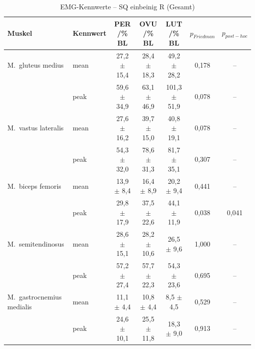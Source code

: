 \begin{table}[H]
  \centering
  \caption{EMG-Kennwerte – SQ einbeinig R (Gesamt)}
  \label{tab:SQ_einbeinig_R_Gesamt}
  \small
  \begin{tabular}{l l c c c c c }
    \hline
\textbf{Muskel} & \textbf{Kennwert} & \textbf{PER /\% BL} & \textbf{OVU /\% BL} & \textbf{LUT /\% BL} & \textbf{$p_{Friedman}$} & \textbf{$p_{post-hoc}$} \\
    \hline
    M.~gluteus medius & mean & 27{,}2 $\pm$ 15{,}4 & 28{,}4 $\pm$ 18{,}3 & 49{,}2 $\pm$ 28{,}2 & 0{,}178 & --\\
     & peak & 59{,}6 $\pm$ 34{,}9 & 63{,}1 $\pm$ 46{,}9 & 101{,}3 $\pm$ 51{,}9 & 0{,}078 & --\\
    \hline
    M.~vastus lateralis & mean & 27{,}6 $\pm$ 16{,}2 & 39{,}7 $\pm$ 15{,}0 & 40{,}8 $\pm$ 19{,}1 & 0{,}078 & --\\
     & peak & 54{,}3 $\pm$ 32{,}0 & 78{,}6 $\pm$ 31{,}3 & 81{,}7 $\pm$ 35{,}1 & 0{,}307 & --\\
    \hline
    M.~biceps femoris & mean & 13{,}9 $\pm$ 8{,}4 & 16{,}4 $\pm$ 8{,}9 & 20{,}2 $\pm$ 9{,}4 & 0{,}441 & --\\
     & peak & 29{,}8 $\pm$ 17{,}9 & 37{,}5 $\pm$ 22{,}6 & 44{,}1 $\pm$ 11{,}9 & 0{,}038 & 0{,}041\\
    \hline
    M.~semitendinosus & mean & 28{,}6 $\pm$ 15{,}1 & 28{,}2 $\pm$ 10{,}6 & 26{,}5 $\pm$ 9{,}6 & 1{,}000 & --\\
     & peak & 57{,}2 $\pm$ 27{,}4 & 57{,}7 $\pm$ 22{,}3 & 54{,}3 $\pm$ 23{,}6 & 0{,}695 & --\\
    \hline
    M.~gastrocnemius medialis & mean & 11{,}1 $\pm$ 4{,}4 & 10{,}8 $\pm$ 4{,}4 & 8{,}5 $\pm$ 4{,}5 & 0{,}529 & --\\
     & peak & 24{,}6 $\pm$ 10{,}1 & 25{,}5 $\pm$ 11{,}8 & 18{,}3 $\pm$ 9{,}0 & 0{,}913 & --\\
    \hline
  \end{tabular}
\end{table}
